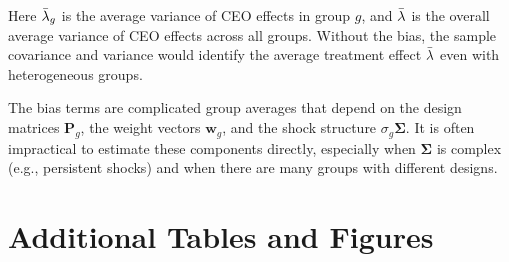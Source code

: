 \documentclass[11pt,a4paper]{article}
\begin{document}
Here $\Bar\lambda_g$ is the average variance of CEO effects in group $g$, and $\Bar\lambda$ is the overall average variance of CEO effects across all groups. Without the bias, the sample covariance and variance would identify the average treatment effect $\Bar\lambda$ even with heterogeneous groups.

The bias terms are complicated group averages that depend on the design matrices $\mathbf P_g$, the weight vectors $\mathbf w_g$, and the shock structure $\sigma_g\mathbf\Sigma$. It is often impractical to estimate these components directly, especially when $\mathbf\Sigma$ is complex (e.g., persistent shocks) and when there are many groups with different designs.

\section{Additional Tables and Figures}



%
\end{document}
